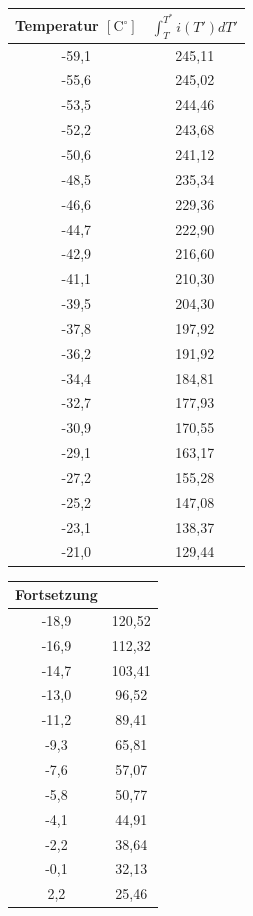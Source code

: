 \begin{table}[htbp]
\begin{minipage}[t]{0.45\textwidth}
\centering
\begin{tabular}{c|c}
Temperatur $[\text{C}^\circ]$ & $\int ^{T^*}_{T} i(T')dT'$\\\hline
-59,1 &245,11\\\hline
-55,6 &245,02\\\hline
-53,5 &244,46\\\hline
-52,2 &243,68\\\hline
-50,6 &241,12\\\hline
-48,5 &235,34\\\hline
-46,6 &229,36\\\hline
-44,7 &222,90\\\hline
-42,9 &216,60\\\hline
-41,1 &210,30\\\hline
-39,5 &204,30\\\hline
-37,8 &197,92\\\hline
-36,2 &191,92\\\hline
-34,4 &184,81\\\hline
-32,7 &177,93\\\hline
-30,9 &170,55\\\hline
-29,1 &163,17\\\hline
-27,2 &155,28\\\hline
-25,2 &147,08\\\hline
-23,1 &138,37\\\hline
-21,0 &129,44\\
\end{tabular}
\end{minipage}
\begin{minipage}[t]{0.45\textwidth}
\centering
\begin{tabular}{c|c}
Fortsetzung & \\\hline
-18,9 &120,52\\\hline
-16,9 &112,32\\\hline
-14,7 &103,41\\\hline
-13,0 &96,52\\\hline
-11,2 &89,41\\\hline
-9,3 &65,81\\\hline
-7,6 &57,07\\\hline
-5,8 &50,77\\\hline
-4,1 &44,91\\\hline
-2,2 &38,64\\\hline
-0,1 &32,13\\\hline
2,2 &25,46\\\hline

\end{tabular}
\end{minipage}
\end{table}
